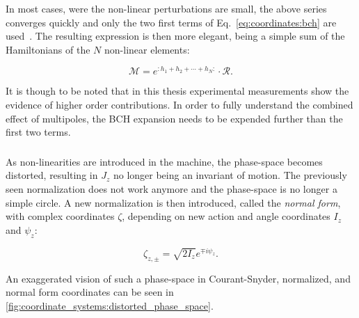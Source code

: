 In most cases, were the non-linear perturbations are small, the above series converges quickly
and only the two first terms of Eq.~\eqref{eq:coordinates:bch} are
used~\cite{carlier_nonlinear_2020-1}. The resulting expression is then more elegant, being a simple
sum of the Hamiltonians of the $N$ non-linear elements:

\begin{equation}
   \mathcal{M} = e^{:h_1 + h_2 + \cdots + h_N:} \cdot \mathcal{R}.
\end{equation}

It is though to be noted that in this thesis experimental measurements show the evidence of higher
order contributions. In order to fully understand the combined effect of multipoles, the BCH
expansion needs to be expended further than the first two terms.



\subsubsection{}

As non-linearities are introduced in the machine, the phase-space becomes distorted, resulting in
$J_z$ no longer being an invariant of motion. The previously seen normalization does not work
anymore and the phase-space is no longer a simple circle. A new normalization is then introduced,
called the \textit{normal form}, with complex coordinates $\zeta$, depending on new action and
angle coordinates $I_z$ and $\psi_z$:

\begin{equation}
    \zeta_{z,\pm} = \sqrt{2I_z} e^{\mp i \psi_z}.
    \label{eq:coordinate_systems:normal_form_coordinates}
\end{equation}

An exaggerated vision of such a phase-space in Courant-Snyder, normalized, and normal form
coordinates can be seen in \cref{fig:coordinate_systems:distorted_phase_space}.

